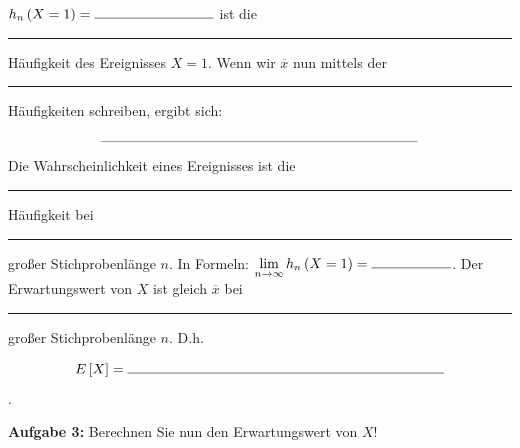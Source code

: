 \documentclass{article}
\begin{document}
$h_n\left(X=1\right) = \rule{3cm}{.4pt}$ ist die \rule{3cm}{.4pt} H\"aufigkeit des Ereignisses $X=1$. Wenn wir $\overline{x}$ nun mittels der \rule{3cm}{.4pt} Häufigkeiten schreiben, ergibt sich:
$$ \rule{8cm}{.4pt} $$
Die Wahrscheinlichkeit eines Ereignisses ist die \rule{3cm}{.4pt} H\"aufigkeit bei \rule{3cm}{.4pt} großer Stichprobenl\"ange $n$. In Formeln: $ \lim\limits_{n \rightarrow \infty}{h_n\left(X=1\right)} = \rule{2cm}{.4pt} $.
Der Erwartungswert von $X$ ist gleich $\overline{x}$ bei \rule{3cm}{.4pt} großer Stichprobenl\"ange $n$. D.h.

$$ E\left[ X \right] = \rule{8cm}{.4pt}$$.

\textbf{Aufgabe 3:} Berechnen Sie nun den Erwartungswert von $X$!
\end{document}
